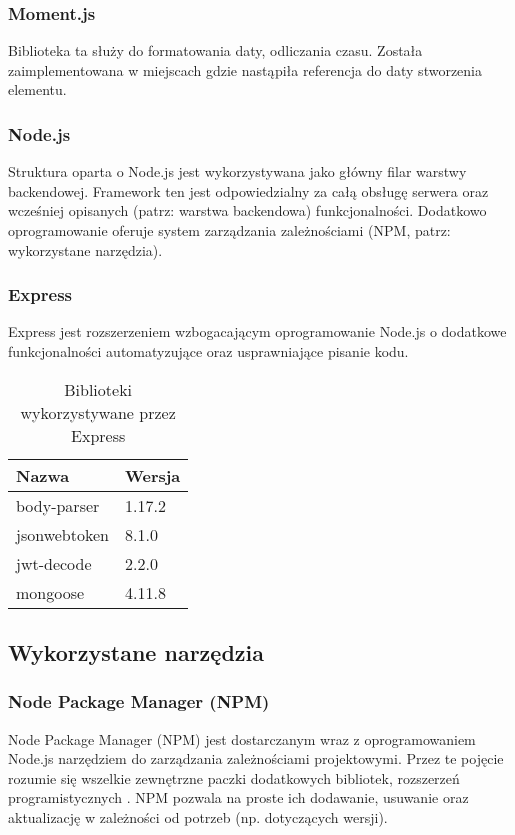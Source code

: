 \documentclass[eng,printmode]{mgr}
\begin{document}
\subsubsection{Moment.js}
Biblioteka ta \cite{MomentJS} służy do formatowania daty, odliczania czasu. Została zaimplementowana w miejscach gdzie nastąpiła referencja do daty stworzenia elementu.

\subsubsection{Node.js}
Struktura oparta o Node.js \cite{NodeJS} jest wykorzystywana jako główny filar warstwy backendowej. Framework ten jest odpowiedzialny za całą obsługę serwera oraz wcześniej opisanych (patrz: warstwa backendowa) funkcjonalności. Dodatkowo oprogramowanie oferuje system zarządzania zależnościami (NPM, patrz: wykorzystane narzędzia).

\subsubsection{Express}
Express \cite{Express} jest rozszerzeniem wzbogacającym oprogramowanie Node.js o dodatkowe funkcjonalności automatyzujące oraz usprawniające pisanie kodu.

\begin{table}[H]
\begin{tabularx}{\textwidth}{|X|X|}
   \hline
    \textbf{Nazwa} & \textbf{Wersja} \\
   \hline
     body-parser & 1.17.2 \\
   \hline
     jsonwebtoken & 8.1.0 \\
   \hline
  	 jwt-decode & 2.2.0 \\
   \hline
   	 mongoose & 4.11.8 \\
   \hline
\end{tabularx}
\caption{Biblioteki wykorzystywane przez Express}
\end{table}

\subsection{Wykorzystane narzędzia}

\subsubsection{Node Package Manager (NPM)}
Node Package Manager (NPM) \cite{NPM} jest dostarczanym wraz z oprogramowaniem Node.js narzędziem do zarządzania zależnościami projektowymi. Przez te pojęcie rozumie się wszelkie zewnętrzne paczki dodatkowych bibliotek, rozszerzeń programistycznych . NPM pozwala na proste ich dodawanie, usuwanie oraz aktualizację w zależności od potrzeb (np. dotyczących wersji).
\end{document}
